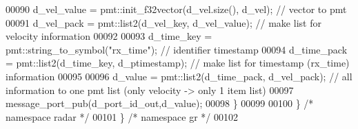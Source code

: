 \begin{DoxyCode}
00090         d_vel_value = pmt::init\_f32vector(d_vel.size(), d_vel); \textcolor{comment}{// vector to pmt}
00091         d_vel_pack = pmt::list2(d_vel_key, d_vel_value); \textcolor{comment}{// make list for velocity information}
00092         
00093         d_time_key = pmt::string\_to\_symbol(\textcolor{stringliteral}{"rx\_time"}); \textcolor{comment}{// identifier timestamp}
00094         d_time_pack = pmt::list2(d_time_key, d_ptimestamp); \textcolor{comment}{// make list for timestamp (rx\_time)
       information}
00095         
00096         d_value = pmt::list2(d_time_pack, d\_vel\_pack); \textcolor{comment}{// all information to one pmt list (only velocity ->
       only 1 item list)}
00097         message\_port\_pub(d_port_id_out,d_value);
00098     \}
00099 
00100   \} \textcolor{comment}{/* namespace radar */}
00101 \} \textcolor{comment}{/* namespace gr */}
00102 
\end{DoxyCode}
